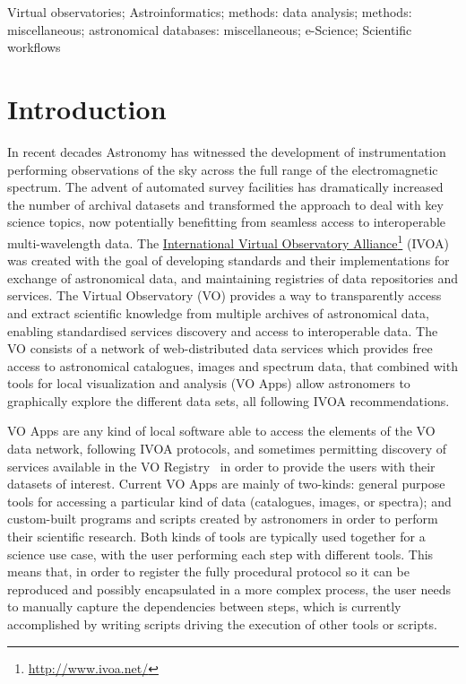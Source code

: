 \documentclass[final,authoryear,5p,times,twocolumn]{elsarticle}
\newcommand{\urlsamefont}[1]{\urlstyle{same}\url{#1}}
\newcommand{\hrefnote}[2]{\href{#1}{#2}\footnote{\urlsamefont{#1}}}
\begin{document}
\begin{frontmatter}
\begin{keyword}
Virtual observatories; Astroinformatics; methods: data analysis; methods: miscellaneous; astronomical databases: miscellaneous; e-Science; Scientific workflows
\end{keyword}

\end{frontmatter}

\section{Introduction}
\label{Introduction}

In recent decades Astronomy has witnessed the development of instrumentation performing observations of the sky across the full range of the electromagnetic spectrum. The advent of automated survey facilities has dramatically increased the number of archival datasets and transformed the approach to deal with key science topics, now potentially benefitting from seamless access to interoperable multi-wavelength data. The \hrefnote{http://www.ivoa.net/}{International Virtual  Observatory Alliance} (IVOA) was created with the goal of developing standards and their implementations for exchange of astronomical data, and maintaining registries of data repositories and services. The Virtual Observatory (VO) provides a way to transparently access and extract scientific knowledge from multiple archives of astronomical data, enabling standardised services discovery and access to interoperable data.  The VO consists of a network of web-distributed data services which provides free access to astronomical catalogues, images and spectrum data, that combined with tools for local visualization and analysis (VO Apps) allow astronomers to graphically explore the different data sets, all following IVOA recommendations.

VO Apps are any kind of local software able to access the elements of the VO data network, following IVOA protocols, and sometimes permitting discovery of services available in the VO Registry~\citep{Benson2009} in order to provide the users with their datasets of  interest. Current VO Apps are mainly of two-kinds: general purpose tools for accessing a particular kind of data (catalogues, images, or spectra); and custom-built programs and scripts created by astronomers in order to perform their scientific research. Both kinds of tools are typically used together for a science use case, with the user performing each step with different tools. This means that, in order to register the fully procedural protocol so it can be reproduced and possibly encapsulated in a more complex process, the user needs to manually capture the dependencies between steps, which is currently accomplished by writing scripts driving the execution of other tools or scripts.
\end{document}
